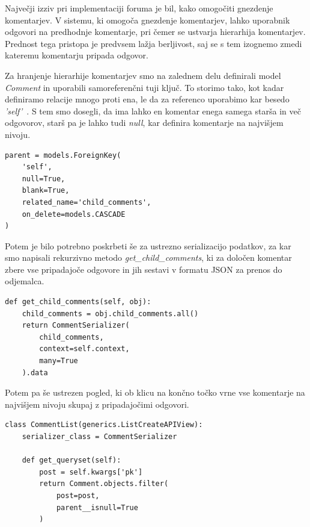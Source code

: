 \documentclass[a4paper,12pt,openright]{book}
\begin{document}
Največji izziv pri implementaciji foruma je bil, kako omogočiti gnezdenje komentarjev.
V sistemu, ki omogoča gnezdenje komentarjev, lahko uporabnik odgovori na predhodnje komentarje, pri čemer se ustvarja hierarhija komentarjev.
Prednost tega pristopa je predvsem lažja berljivost, saj se s tem izognemo zmedi kateremu komentarju pripada odgovor.

Za hranjenje hierarhije komentarjev smo na zalednem delu definirali model \textit{Comment} in uporabili samoreferenčni tuji ključ.
To storimo tako, kot kadar definiramo relacije mnogo proti ena, le da za referenco uporabimo kar besedo \textit{'self'}~\cite{djangoselfreference}.
S tem smo dosegli, da ima lahko en komentar enega samega starša in več odgovorov, starš pa je lahko tudi \textit{null}, kar definira komentarje na najvišjem nivoju.
\begin{lstlisting}[label=code12,caption=Definiranje hierarhije komentarjev v modelu Comment z uporabo samoreferenčnega tujega ključa.,frame=tb,captionpos=b]
parent = models.ForeignKey(
    'self',
    null=True,
    blank=True,
    related_name='child_comments',
    on_delete=models.CASCADE
)
\end{lstlisting}

Potem je bilo potrebno poskrbeti še za ustrezno serializacijo podatkov, za kar smo napisali rekurzivno metodo \textit{get\_child\_comments}, ki za določen komentar zbere vse pripadajoče odgovore in jih sestavi v formatu JSON za prenos do odjemalca.
\begin{lstlisting}[label=code13,caption=Rekurzivna metoda za serializacijo komentarjev v obliki nadrejen/podrejen.,frame=tb,captionpos=b]
def get_child_comments(self, obj):
    child_comments = obj.child_comments.all()
    return CommentSerializer(
        child_comments,
        context=self.context,
        many=True
    ).data
\end{lstlisting}

Potem pa še ustrezen pogled, ki ob klicu na končno točko vrne vse komentarje na najvišjem nivoju skupaj z pripadajočimi odgovori.
\begin{lstlisting}[label=code14,caption=Pogled\, ki s filtriranjem izbere samo komentarje na najvišjem nivoju.,frame=tb,captionpos=b]
class CommentList(generics.ListCreateAPIView):
    serializer_class = CommentSerializer

    def get_queryset(self):
        post = self.kwargs['pk']
        return Comment.objects.filter(
            post=post, 
            parent__isnull=True
        )
\end{lstlisting}
\end{document}
